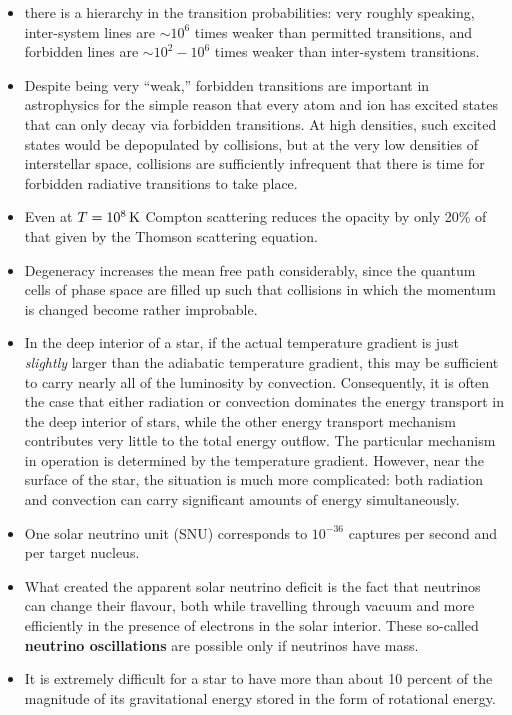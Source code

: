 \documentclass[a4paper,10pt]{article}
\begin{document}
\begin{itemize}
    \item there is a hierarchy in the transition probabilities: very roughly speaking, inter-system lines are $\sim10^6$ times weaker than permitted transitions, and forbidden lines are $\sim10^2-10^6$ times weaker than inter-system transitions.
    \item Despite being very ``weak,'' forbidden transitions are important in astrophysics for the simple reason that every atom and ion has excited states that can only decay via forbidden transitions. At high densities, such excited states would be depopulated by collisions, but at the very low densities of interstellar space, collisions are sufficiently infrequent that there is time for forbidden radiative transitions to take place.
    \item Even at $T=10^8\,{\rm K}$ Compton scattering reduces the opacity by only 20\% of that given by the Thomson scattering equation.
    \item Degeneracy increases the mean free path considerably, since the quantum cells of phase space are filled up such that collisions in which the momentum is changed become rather improbable.
    \item In the deep interior of a star, if the actual temperature gradient is just \textit{slightly} larger than the adiabatic temperature gradient, this may be sufficient to carry nearly all of the luminosity by convection. Consequently, it is often the case that either radiation or convection dominates the energy transport in the deep interior of stars, while the other energy transport mechanism contributes very little to the total energy outflow. The particular mechanism in operation is determined by the temperature gradient. However, near the surface of the star, the situation is much more complicated: both radiation and convection can carry significant amounts of energy simultaneously.
    \item One solar neutrino unit (SNU) corresponds to $10^{-36}$ captures per second and per target nucleus.
    \item What created the apparent solar neutrino deficit is the fact that neutrinos can change their flavour, both while travelling through vacuum and more efficiently in the presence of electrons in the solar interior. These so-called \textbf{neutrino oscillations} are possible only if neutrinos have mass.
    \item It is extremely difficult for a star to have more than about 10 percent of the magnitude of its gravitational energy stored in the form of rotational energy.

\end{itemize}
\end{document}
